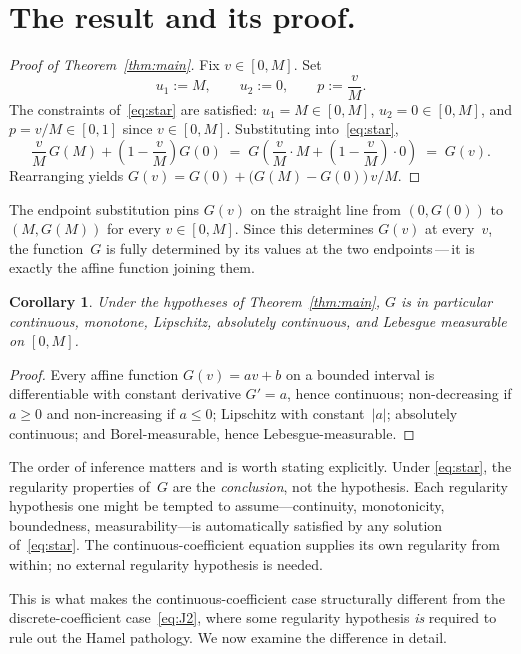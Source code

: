 \documentclass{article}
\theoremstyle{plain}
\newtheorem{corollary}[theorem]{Corollary}
\theoremstyle{definition}
\begin{document}
\section{The result and its proof.}
\label{sec:proof}

\begin{proof}[Proof of Theorem~\ref{thm:main}]
Fix $v\in[0,M]$. Set
\[
u_1 := M, \qquad u_2 := 0, \qquad p := \frac{v}{M}.
\]
The constraints of~\eqref{eq:star} are satisfied: $u_1=M\in[0,M]$,
$u_2=0\in[0,M]$, and $p=v/M\in[0,1]$ since $v\in[0,M]$.
Substituting into~\eqref{eq:star},
\[
\frac{v}{M}\,G(M)+\left(1-\frac{v}{M}\right)G(0)
\;=\;
G\!\left(\frac{v}{M}\cdot M+\left(1-\frac{v}{M}\right)\cdot 0\right)
\;=\; G(v).
\]
Rearranging yields $G(v)=G(0)+\bigl(G(M)-G(0)\bigr)\,v/M$.
\end{proof}

The endpoint substitution pins $G(v)$ on the straight line from
$(0,G(0))$ to $(M,G(M))$ for every $v\in[0,M]$. Since this determines
$G(v)$ at every~$v$, the function~$G$ is fully determined by its values
at the two endpoints\,---\,it is exactly the affine function joining them.

\begin{corollary}\label{cor:regularity}
Under the hypotheses of Theorem~\ref{thm:main}, $G$ is in particular
continuous, monotone, Lipschitz, absolutely continuous, and
Lebesgue measurable on $[0,M]$.
\end{corollary}

\begin{proof}
Every affine function $G(v)=av+b$ on a bounded interval is differentiable
with constant derivative $G'=a$, hence continuous; non-decreasing if
$a\ge0$ and non-increasing if $a\le0$; Lipschitz with constant~$|a|$;
absolutely continuous; and Borel-measurable, hence Lebesgue-measurable.
\end{proof}

The order of inference matters and is worth stating explicitly. Under
\eqref{eq:star}, the regularity properties of~$G$ are the
\emph{conclusion}, not the hypothesis. Each regularity hypothesis one
might be tempted to assume---continuity, monotonicity, boundedness,
measurability---is automatically satisfied by any solution
of~\eqref{eq:star}. The continuous-coefficient equation supplies its own
regularity from within; no external regularity hypothesis is needed.

This is what makes the continuous-coefficient case structurally different
from the discrete-coefficient case~\eqref{eq:J2}, where some regularity
hypothesis \emph{is} required to rule out the Hamel pathology. We now
examine the difference in detail.
\end{document}
